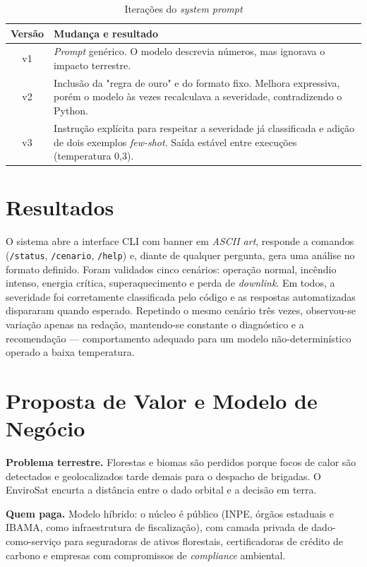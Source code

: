 \documentclass[12pt,a4paper]{article}
\begin{document}
\begin{table}[H]
\centering
\caption{Iterações do \textit{system prompt}}
\label{tab:iteracoes}
\small
\begin{tabular}{@{}cp{11cm}@{}}
\toprule
\textbf{Versão} & \textbf{Mudança e resultado} \\
\midrule
v1 & \textit{Prompt} genérico. O modelo descrevia números, mas ignorava o impacto terrestre. \\
v2 & Inclusão da "regra de ouro" e do formato fixo. Melhora expressiva, porém o modelo às vezes recalculava a severidade, contradizendo o Python. \\
v3 & Instrução explícita para respeitar a severidade já classificada e adição de dois exemplos \textit{few-shot}. Saída estável entre execuções (temperatura 0,3). \\
\bottomrule
\end{tabular}
\end{table}

\section{Resultados}

O sistema abre a interface CLI com banner em \textit{ASCII art}, responde a comandos (\texttt{/status}, \texttt{/cenario}, \texttt{/help}) e, diante de qualquer pergunta, gera uma análise no formato definido. Foram validados cinco cenários: operação normal, incêndio intenso, energia crítica, superaquecimento e perda de \textit{downlink}. Em todos, a severidade foi corretamente classificada pelo código e as respostas automatizadas dispararam quando esperado. Repetindo o mesmo cenário três vezes, observou-se variação apenas na redação, mantendo-se constante o diagnóstico e a recomendação --- comportamento adequado para um modelo não-determinístico operado a baixa temperatura.

\section{Proposta de Valor e Modelo de Negócio}

\textbf{Problema terrestre.} Florestas e biomas são perdidos porque focos de calor são detectados e geolocalizados tarde demais para o despacho de brigadas. O EnviroSat encurta a distância entre o dado orbital e a decisão em terra.

\textbf{Quem paga.} Modelo híbrido: o núcleo é público (INPE, órgãos estaduais e IBAMA, como infraestrutura de fiscalização), com camada privada de dado-como-serviço para seguradoras de ativos florestais, certificadoras de crédito de carbono e empresas com compromissos de \textit{compliance} ambiental.
\end{document}
